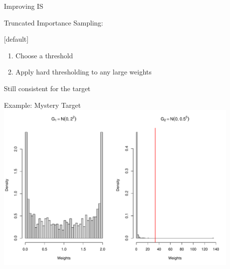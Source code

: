 \documentclass[14pt]{beamer}
\begin{document}
\begin{frame}{Improving IS}
    \begin{outline}
        \1 Truncated Importance Sampling:
            \2 \citep{Ion08} \newline
    \end{outline}

    [default]
    \begin{enumerate}
        \item Choose a threshold
        \item Apply hard thresholding to any large weights \newline
    \end{enumerate}
    \begin{outline}
        \1 Still consistent for the target
    \end{outline}
\end{frame}

\begin{frame}{Example: Mystery Target}
    \centering
    \includegraphics[height=0.9\textheight, width=0.9\textwidth, keepaspectratio]{Figures/Wt Hist - Thresh.pdf}
\end{frame}

\end{document}
